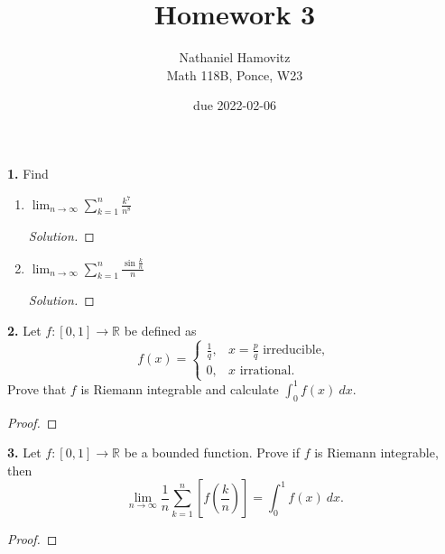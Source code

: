 \documentclass{article}
\newcommand{\R}{\mathbb{R}}
\newcommand{\brac}[1]{\left[ #1 \right]}
\newcommand{\paren}[1]{\left( #1 \right)}
\newenvironment{solution}{\begin{proof}[Solution]}{\end{proof}}
\newcommand{\problem}[1]{\noindent \textbf{#1}}
\begin{document}
\renewcommand{\labelenumi}{(\alph{enumi})}


\title{Homework 3} %
\author{Nathaniel Hamovitz\\Math 118B, Ponce, W23}
\date{due 2022-02-06}

\maketitle

\problem{1. }
Find
\begin{enumerate}
    \item 
    $\displaystyle \lim_{n \to \infty} \sum_{k = 1}^{n} \frac{k^7}{n^8}$
    \begin{solution}

    \end{solution}
    
    \item 
    $\displaystyle \lim_{n \to \infty} \sum_{k = 1}^{n} \frac{\sin \frac{k}{n}}{n}$
    \begin{solution}

    \end{solution}
\end{enumerate}


\problem{2. }
Let $f: [0, 1] \to \R$ be defined as
$$f(x) = \begin{cases}
    \frac{1}{q}, & x = \frac{p}{q} \text{ irreducible}, \\
    0, & x \text{ irrational}.
\end{cases}$$
Prove that $f$ is Riemann integrable and calculate $\int_{0}^{1} f(x) \: dx$.

\begin{proof}
    
\end{proof}


\problem{3. }
Let $f: [0, 1] \to \R$ be a bounded function. Prove if $f$ is Riemann integrable, then
$$\lim_{n \to \infty} \frac{1}{n} \sum_{k = 1}^{n} \brac{f\paren{\frac{k}{n}}} = \int_{0}^{1} f(x) \: dx.$$

\begin{proof}
    
\end{proof}
\end{document}
